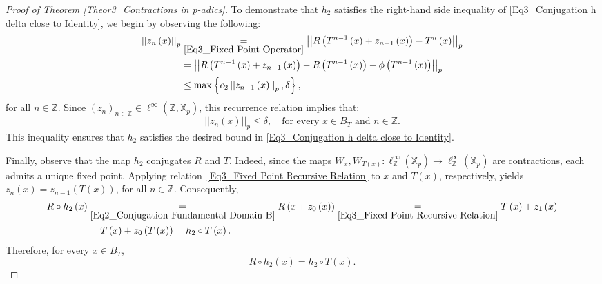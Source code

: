 \documentclass[10pt,a4paper]{amsart}
\begin{document}
\begin{proof}[Proof of Theorem \ref{Theor3_Contractions in p-adics}]
		
		To demonstrate that $h_{2}$ satisfies the right-hand side inequality of \eqref{Eq3_Conjugation h delta close to Identity}, we begin by observing the following:   
		\begin{align*}  \left| \left|  z_{n} \left(  x  \right)   \right|  \right|_{p}   &
			\underset{\eqref{Eq3_Fixed Point Operator}}{=}    \left| \left|  R \left(  T^{n-1} \left(  x  \right)  + z_{n-1} \left(  x  \right)   \right)  - T^{n} \left(  x  \right)    \right|  \right|_{p}  \\  
			& =    \left| \left|  R \left(  T^{n-1} \left(  x  \right)  + z_{n-1} \left(  x  \right)   \right)  - R \left(  T^{n-1} \left(  x  \right)   \right)  - \phi \left(  T^{n-1} \left(  x  \right)   \right)    \right|  \right|_{p}   \\  
			& \le    \max \left\{  c_{2}  \left| \left|  z_{n-1} \left(  x  \right)   \right|  \right|_{p},   \delta  \right\} ,
		\end{align*}
		for all $n \in \mathbb{Z} $. Since $ \left(  z_{n}   \right)_{n \in \mathbb{Z} } \in \ell^{ \infty } \left(  \mathbb{Z} , \mathbb{X}_{p}  \right) $, this recurrence relation implies that:  
		\begin{equation}\label{Eq3_Fixed Point delta small}
			\left| \left|  z_{n} \left(  x  \right)   \right|  \right|_{p}   \le   \delta, \quad \text{for every } x \in B_{T} \text{ and } n \in \mathbb{Z} . 
		\end{equation}
		This inequality ensures that $h_{2}$ satisfies the desired bound in \eqref{Eq3_Conjugation h delta close to Identity}.
		
		
		Finally, observe that the map $h_{2}$ conjugates $R$ and $T$. 
		Indeed, since the maps $W_{x}, W_{T \left(  x  \right) } : \ell^{ \infty }_{\mathbb{Z} } \left(  \mathbb{X}_{p}  \right)  \to \ell^{ \infty }_{\mathbb{Z} } \left(  \mathbb{X}_{p}  \right) $ are contractions, each admits a unique fixed point. Applying relation~\eqref{Eq3_Fixed Point Recursive Relation} to $x$ and $T \left(  x  \right) $, respectively, yields $ z_{n} \left(  x  \right)  = z_{n - 1} \left(  T \left(  x  \right)   \right) $, for all $n \in \mathbb{Z} $. Consequently,  
		\begin{align*} 
			R \circ h_{2} \left(  x  \right)    &\underset{\eqref{Eq2_Conjugation Fundamental Domain B}}{=}   R \left(  x + z_{0} \left(  x  \right)   \right)    \underset{\eqref{Eq3_Fixed Point Recursive Relation}}{=}   T \left(  x  \right)  + z_{1} \left(  x  \right)   \\  
			&=   T \left(  x  \right)  + z_{0} \left(  T \left(  x  \right)   \right)    =   h_{2} \circ T \left(  x  \right)  .
		\end{align*}
		Therefore, for every $x \in B_{T}$,  
		\begin{equation}\label{Eq3_Homeorphism 2 Conjugation}
			R\circ h_{2} \left(  x  \right)    =   h_{2} \circ T(x) .
		\end{equation}
		

\end{proof}
\end{document}
